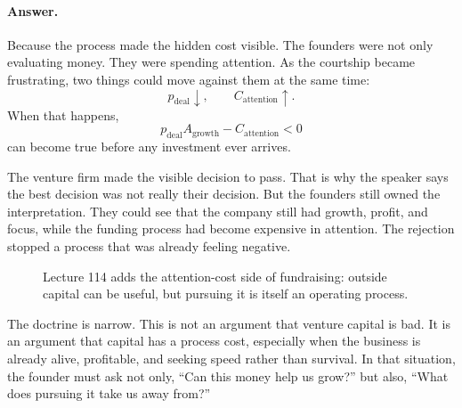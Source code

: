 \documentclass[11pt,oneside]{book}
\begin{document}
\paragraph{Answer.}
Because the process made the hidden cost visible. The founders were not only evaluating money. They were spending attention. As the courtship became frustrating, two things could move against them at the same time:
\[
p_{\mathrm{deal}}\downarrow,
\qquad
C_{\mathrm{attention}}\uparrow.
\]
When that happens,
\[
p_{\mathrm{deal}}A_{\mathrm{growth}}
-
C_{\mathrm{attention}}
<0
\]
can become true before any investment ever arrives.

The venture firm made the visible decision to pass. That is why the speaker says the best decision was not really their decision. But the founders still owned the interpretation. They could see that the company still had growth, profit, and focus, while the funding process had become expensive in attention. The rejection stopped a process that was already feeling negative.

\begin{figure}
\centering
{}
\caption{Lecture 114 adds the attention-cost side of fundraising: outside capital can be useful, but pursuing it is itself an operating process.}
\end{figure}

The doctrine is narrow. This is not an argument that venture capital is bad. It is an argument that capital has a process cost, especially when the business is already alive, profitable, and seeking speed rather than survival. In that situation, the founder must ask not only, ``Can this money help us grow?'' but also, ``What does pursuing it take us away from?''
\end{document}
